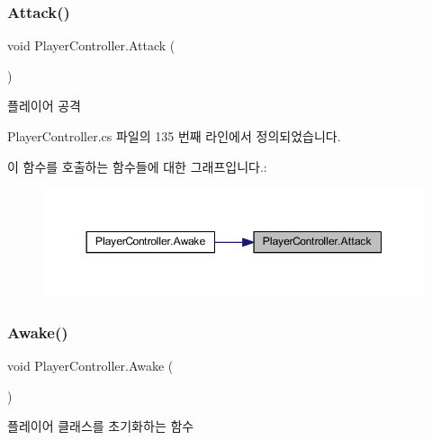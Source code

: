 \subsubsection{\texorpdfstring{Attack()}{Attack()}}
{\footnotesize\ttfamily void Player\+Controller.\+Attack (\begin{DoxyParamCaption}{ }\end{DoxyParamCaption})}



플레이어 공격 



Player\+Controller.\+cs 파일의 135 번째 라인에서 정의되었습니다.


\begin{DoxyCode}{0}

\end{DoxyCode}
이 함수를 호출하는 함수들에 대한 그래프입니다.\+:\nopagebreak
\begin{figure}[H]
\begin{center}
\leavevmode
\includegraphics[width=350pt]{dc/dde/class_player_controller_a473a610cfe2a374d5cb39b3c44881d11_icgraph}
\end{center}
\end{figure}
\mbox{\label{class_player_controller_a050967f0e5c2340cb21861e4c8c788a1}} 
\subsubsection{\texorpdfstring{Awake()}{Awake()}}
{\footnotesize\ttfamily void Player\+Controller.\+Awake (\begin{DoxyParamCaption}{ }\end{DoxyParamCaption})\hspace{0.3cm}{\ttfamily [private]}}



플레이어 클래스를 초기화하는 함수 

